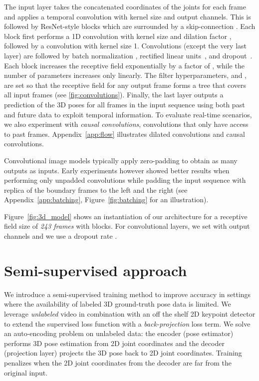 \documentclass[10pt,twocolumn,letterpaper]{article}
\begin{document}
The input layer takes the concatenated  coordinates of the  joints for each frame and applies a temporal convolution with kernel size  and  output channels. 
This is followed by  ResNet-style blocks which are surrounded by a skip-connection \cite{he:deep:2016}.
Each block first performs a 1D convolution with kernel size  and dilation factor , followed by a convolution with kernel size 1.
Convolutions (except the very last layer) are followed by batch normalization \cite{ioffe:batch:2015}, rectified linear units~\cite{nair2010rectified}, and dropout~\cite{srivastava:dropout:2014}.
Each block increases the receptive field exponentially by a factor of , while the number of parameters increases only linearly. 
The filter hyperparameters,  and , are set so that the receptive field for any output frame forms a tree that covers all input frames (see \textsection\ref{fig:convolutions}). 
Finally, the last layer outputs a prediction of the 3D poses for all frames in the input sequence using both past and future data to exploit temporal information.
To evaluate real-time scenarios, we also experiment with \emph{causal convolutions}, \ie convolutions that only have access to past frames. Appendix~\ref{app:flow}
illustrates dilated convolutions and causal convolutions.

Convolutional image models typically apply zero-padding to obtain as many outputs as inputs. Early experiments however showed better results when performing only unpadded convolutions while padding the input sequence with replica of the boundary frames to the left and the right (see Appendix~\ref{app:batching}, Figure~\ref{fig:batching} for an illustration). 

Figure~\ref{fig:3d_model} shows an instantiation of our architecture for a receptive field size of \emph{243 frames} with  blocks.
For convolutional layers, we set  with  output channels and we use a dropout rate .


\section{Semi-supervised approach}
\label{sec:semi}

We introduce a semi-supervised training method to improve accuracy in settings where the availability of labeled 3D ground-truth pose data is limited.
We leverage \emph{unlabeled} video in combination with an off the shelf 2D keypoint detector to extend the supervised loss function with a \emph{back-projection} loss term. 
We solve an auto-encoding problem on unlabeled data: the encoder (pose estimator) performs 3D pose estimation from 2D joint coordinates and the decoder (projection layer) projects the 3D pose back to 2D joint coordinates. Training penalizes when the 2D joint coordinates from the decoder are far from the original input.
\end{document}
